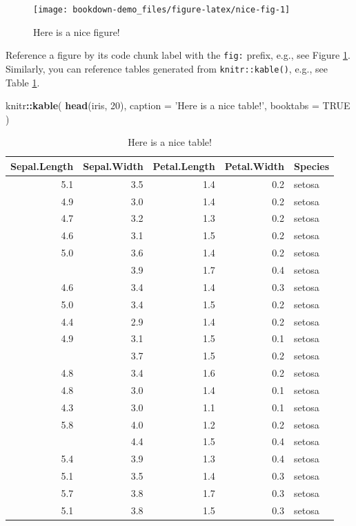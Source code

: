 \documentclass[]{book}
\newenvironment{Shaded}{\begin{snugshade}}{\end{snugshade}}
\newcommand{\DataTypeTok}[1]{\textcolor[rgb]{0.13,0.29,0.53}{#1}}
\newcommand{\DecValTok}[1]{\textcolor[rgb]{0.00,0.00,0.81}{#1}}
\newcommand{\KeywordTok}[1]{\textcolor[rgb]{0.13,0.29,0.53}{\textbf{#1}}}
\newcommand{\NormalTok}[1]{#1}
\newcommand{\OperatorTok}[1]{\textcolor[rgb]{0.81,0.36,0.00}{\textbf{#1}}}
\newcommand{\OtherTok}[1]{\textcolor[rgb]{0.56,0.35,0.01}{#1}}
\newcommand{\StringTok}[1]{\textcolor[rgb]{0.31,0.60,0.02}{#1}}
\begin{document}
\begin{figure}

{\centering \texttt{[image: bookdown-demo\_files/figure-latex/nice-fig-1]} 

}

\caption{Here is a nice figure!}\label{fig:nice-fig}
\end{figure}

Reference a figure by its code chunk label with the \texttt{fig:} prefix, e.g., see Figure \ref{fig:nice-fig}. Similarly, you can reference tables generated from \texttt{knitr::kable()}, e.g., see Table \ref{tab:nice-tab}.

\begin{Shaded}
\begin{Highlighting}[]
\NormalTok{knitr}\OperatorTok{::}\KeywordTok{kable}\NormalTok{(}
  \KeywordTok{head}\NormalTok{(iris, }\DecValTok{20}\NormalTok{), }\DataTypeTok{caption =} \StringTok{'Here is a nice table!'}\NormalTok{,}
  \DataTypeTok{booktabs =} \OtherTok{TRUE}
\NormalTok{)}
\end{Highlighting}
\end{Shaded}

\begin{table}[t]

\caption{\label{tab:nice-tab}Here is a nice table!}
\centering
\begin{tabular}{rrrrl}
\toprule
Sepal.Length & Sepal.Width & Petal.Length & Petal.Width & Species\\
\midrule
5.1 & 3.5 & 1.4 & 0.2 & setosa\\
4.9 & 3.0 & 1.4 & 0.2 & setosa\\
4.7 & 3.2 & 1.3 & 0.2 & setosa\\
4.6 & 3.1 & 1.5 & 0.2 & setosa\\
5.0 & 3.6 & 1.4 & 0.2 & setosa\\
\addlinespace
5.4 & 3.9 & 1.7 & 0.4 & setosa\\
4.6 & 3.4 & 1.4 & 0.3 & setosa\\
5.0 & 3.4 & 1.5 & 0.2 & setosa\\
4.4 & 2.9 & 1.4 & 0.2 & setosa\\
4.9 & 3.1 & 1.5 & 0.1 & setosa\\
\addlinespace
5.4 & 3.7 & 1.5 & 0.2 & setosa\\
4.8 & 3.4 & 1.6 & 0.2 & setosa\\
4.8 & 3.0 & 1.4 & 0.1 & setosa\\
4.3 & 3.0 & 1.1 & 0.1 & setosa\\
5.8 & 4.0 & 1.2 & 0.2 & setosa\\
\addlinespace
5.7 & 4.4 & 1.5 & 0.4 & setosa\\
5.4 & 3.9 & 1.3 & 0.4 & setosa\\
5.1 & 3.5 & 1.4 & 0.3 & setosa\\
5.7 & 3.8 & 1.7 & 0.3 & setosa\\
5.1 & 3.8 & 1.5 & 0.3 & setosa\\
\bottomrule
\end{tabular}
\end{table}
\end{document}
